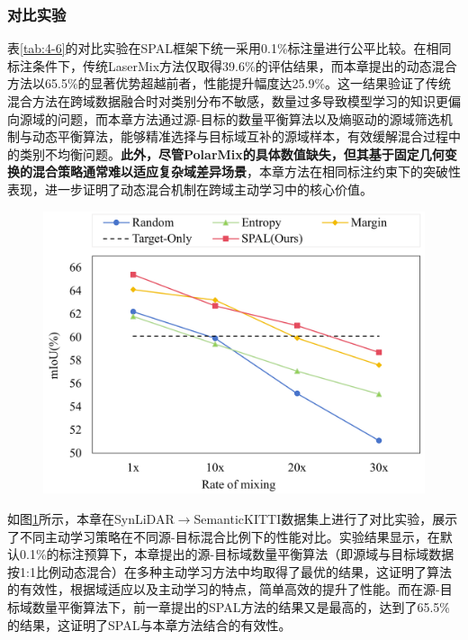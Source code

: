     \subsubsection{对比实验}
    
    表\ref{tab:4-6}的对比实验在SPAL框架下统一采用0.1\%标注量进行公平比较。在相同标注条件下，传统LaserMix方法仅取得39.6\%的评估结果，而本章提出的动态混合方法以65.5\%的显著优势超越前者，性能提升幅度达25.9\%。这一结果验证了传统混合方法在跨域数据融合时对类别分布不敏感，数量过多导致模型学习的知识更偏向源域的问题，而本章方法通过源-目标的数量平衡算法以及熵驱动的源域筛选机制与动态平衡算法，能够精准选择与目标域互补的源域样本，有效缓解混合过程中的类别不均衡问题。\textbf{此外，尽管PolarMix的具体数值缺失，但其基于固定几何变换的混合策略通常难以适应复杂域差异场景}，本章方法在相同标注约束下的突破性表现，进一步证明了动态混合机制在跨域主动学习中的核心价值。
    \vspace{-0.1cm}
    \begin{figure}[H]
        \centering
        \includegraphics[width = \textwidth]{ljx/figure/4-compare-al-mixing.pdf}
        \label{fig:4-compare-al-mixing}
    \end{figure}
    \vspace{-0.35cm}
    如图\ref{fig:4-compare-al-mixing}所示，本章在SynLiDAR$\to$SemanticKITTI数据集上进行了对比实验，展示了不同主动学习策略在不同源-目标混合比例下的性能对比。实验结果显示，在默认0.1\%的标注预算下，本章提出的源-目标域数量平衡算法（即源域与目标域数据按1:1比例动态混合）在多种主动学习方法中均取得了最优的结果，这证明了算法的有效性，根据域适应以及主动学习的特点，简单高效的提升了性能。而在源-目标域数量平衡算法下，前一章提出的SPAL方法的结果又是最高的，达到了65.5\%的结果，这证明了SPAL与本章方法结合的有效性。
    
